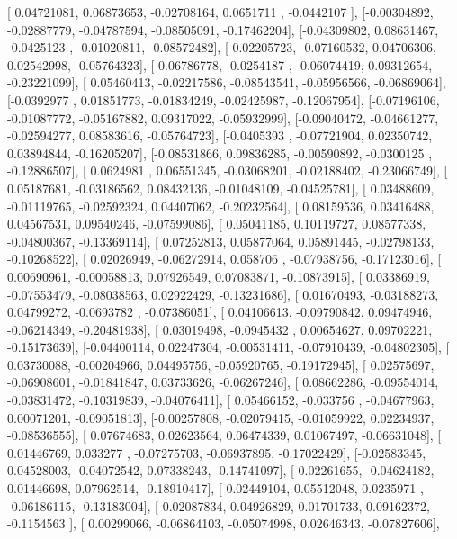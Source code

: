 \documentclass{article}
\begin{document}
       [ 0.04721081,  0.06873653, -0.02708164,  0.0651711 , -0.0442107 ],
       [-0.00304892, -0.02887779, -0.04787594, -0.08505091, -0.17462204],
       [-0.04309802,  0.08631467, -0.0425123 , -0.01020811, -0.08572482],
       [-0.02205723, -0.07160532,  0.04706306,  0.02542998, -0.05764323],
       [-0.06786778, -0.0254187 , -0.06074419,  0.09312654, -0.23221099],
       [ 0.05460413, -0.02217586, -0.08543541, -0.05956566, -0.06869064],
       [-0.0392977 ,  0.01851773, -0.01834249, -0.02425987, -0.12067954],
       [-0.07196106, -0.01087772, -0.05167882,  0.09317022, -0.05932999],
       [-0.09040472, -0.04661277, -0.02594277,  0.08583616, -0.05764723],
       [-0.0405393 , -0.07721904,  0.02350742,  0.03894844, -0.16205207],
       [-0.08531866,  0.09836285, -0.00590892, -0.0300125 , -0.12886507],
       [ 0.0624981 ,  0.06551345, -0.03068201, -0.02188402, -0.23066749],
       [ 0.05187681, -0.03186562,  0.08432136, -0.01048109, -0.04525781],
       [ 0.03488609, -0.01119765, -0.02592324,  0.04407062, -0.20232564],
       [ 0.08159536,  0.03416488,  0.04567531,  0.09540246, -0.07599086],
       [ 0.05041185,  0.10119727,  0.08577338, -0.04800367, -0.13369114],
       [ 0.07252813,  0.05877064,  0.05891445, -0.02798133, -0.10268522],
       [ 0.02026949, -0.06272914,  0.058706  , -0.07938756, -0.17123016],
       [ 0.00690961, -0.00058813,  0.07926549,  0.07083871, -0.10873915],
       [ 0.03386919, -0.07553479, -0.08038563,  0.02922429, -0.13231686],
       [ 0.01670493, -0.03188273,  0.04799272, -0.0693782 , -0.07386051],
       [ 0.04106613, -0.09790842,  0.09474946, -0.06214349, -0.20481938],
       [ 0.03019498, -0.0945432 ,  0.00654627,  0.09702221, -0.15173639],
       [-0.04400114,  0.02247304, -0.00531411, -0.07910439, -0.04802305],
       [ 0.03730088, -0.00204966,  0.04495756, -0.05920765, -0.19172945],
       [ 0.02575697, -0.06908601, -0.01841847,  0.03733626, -0.06267246],
       [ 0.08662286, -0.09554014, -0.03831472, -0.10319839, -0.04076411],
       [ 0.05466152, -0.033756  , -0.04677963,  0.00071201, -0.09051813],
       [-0.00257808, -0.02079415, -0.01059922,  0.02234937, -0.08536555],
       [ 0.07674683,  0.02623564,  0.06474339,  0.01067497, -0.06631048],
       [ 0.01446769,  0.033277  , -0.07275703, -0.06937895, -0.17022429],
       [-0.02583345,  0.04528003, -0.04072542,  0.07338243, -0.14741097],
       [ 0.02261655, -0.04624182,  0.01446698,  0.07962514, -0.18910417],
       [-0.02449104,  0.05512048,  0.0235971 , -0.06186115, -0.13183004],
       [ 0.02087834,  0.04926829,  0.01701733,  0.09162372, -0.1154563 ],
       [ 0.00299066, -0.06864103, -0.05074998,  0.02646343, -0.07827606],
\end{document}
